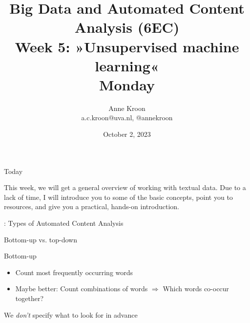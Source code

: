\documentclass[compress]{beamer}
\begin{document}
\title[Big Data and Automated Content Analysis]{\textbf{Big Data and Automated Content Analysis (6EC)} 
\\Week 5: »Unsupervised machine learning«
\\Monday}
\author[Anne Kroon]{Anne Kroon\\ \footnotesize{a.c.kroon@uva.nl, @annekroon \\}}
\date{October 2, 2023}


\begin{frame}{}
	\titlepage
\end{frame}

\begin{frame}{Today}
	\tableofcontents
\end{frame}


\begin{frame}[standout]
This week, we will get a general overview of working with textual data. Due to a lack of time, I will introduce you to some of the basic concepts, point you to resources, and give you a practical, hands-on introduction. 
\end{frame}

\begin{frame}{\cite{Boumans2016}: Types of Automated Content Analysis}
\end{frame}

\begin{frame}{Bottom-up vs. top-down}
\begin{block}{Bottom-up}
	\begin{itemize}
		\item Count most frequently occurring words 
		\item Maybe better: Count combinations of words $\Rightarrow$ Which words co-occur together?
	\end{itemize}
	We \emph{don't} specify what to look for in advance	
\end{block}


\end{frame}
\end{document}
